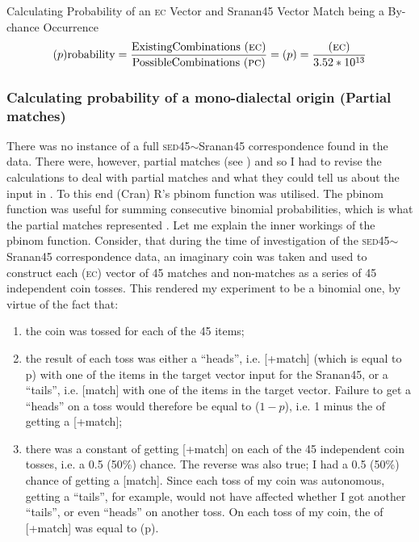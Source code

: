 {{{%
% 
\ea
{Calculating Probability of an \textsc{ec} Vector and Sranan45 Vector Match being a By-chance Occurrence}
\[
\text{($p$)robability} = \frac{\text{ExistingCombinations (\textsc{ec})}}{\text{PossibleCombinations (\textsc{pc})}} = (p) = \frac{(\textsc{ec})}{3.52\ast10^{13}}
\]
\label{exTable 3.12}
\z

\subsubsection{Calculating probability of a mono-dialectal origin (Partial matches)} \label{3.4.3.2}
There was no instance of a full \textsc{sed45}$\sim$Sranan45 correspondence found in the data. There were, however, partial matches (see ) and so I had to revise the  calculations to deal with partial matches and what they could tell us about the  input in . To this end (Cran) R's pbinom function was utilised. The pbinom function was useful for summing consecutive binomial probabilities, which is what the partial matches represented \citep{Larget07}. Let me explain the inner workings of the pbinom function. Consider, that during the time of investigation of the \textsc{sed45}$\sim$Sranan45 correspondence data, an imaginary coin was taken and used to construct each (\textsc{ec}) vector of 45 matches and non-matches as a series of 45 independent coin tosses. This rendered my experiment to be a binomial one, by virtue of the fact that:

\begin{enumerate}
\item {the coin was tossed for each of the 45 items;}
\item{the result of each toss was either a ``heads'', i.e. [+match] (which is equal to p) with one of the items in the target vector input for the Sranan45, or a ``tails'', i.e. [\textminus{}match] with one of the items in the target vector. Failure to get a ``heads'' on a toss would therefore be equal to ($1-p$), i.e. 1 minus the  of getting a [+match];}
\item{there was a constant  of getting [+match] on each of the 45 independent coin tosses, i.e. a 0.5 (50\%) chance. The reverse was also true; I had a 0.5 (50\%) chance of getting a [\textminus{}match]. Since each toss of my coin was autonomous, getting a ``tails'', for example, would not have affected whether I got another ``tails'', or even ``heads'' on another toss. On each toss of my coin, the  of [+match] was equal to (p).}
\end{enumerate}

}}}
